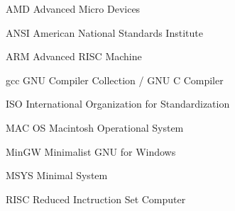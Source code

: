 \begin{siglas}
    \item[AMD] Advanced Micro Devices
    \item[ANSI] American National Standards Institute
    \item[ARM] Advanced RISC Machine
    \item[gcc] GNU Compiler Collection / GNU C Compiler
    \item[ISO] International Organization for Standardization
    \item[MAC OS] Macintosh Operational System
    \item[MinGW] Minimalist GNU for Windows
    \item[MSYS] Minimal System
    \item[RISC] Reduced Inctruction Set Computer
\end{siglas}